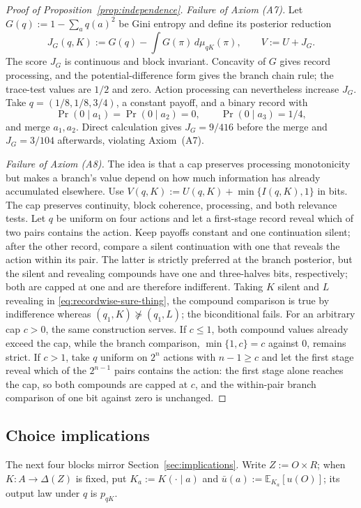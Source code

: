 \documentclass[11pt,a4paper]{article}
\theoremstyle{definition}
\newcommand{\D}{\Delta}
\newcommand{\E}{\mathbb E}
\newcommand{\1}{\mathbf 1}
\begin{document}
\begin{proof}[Proof of Proposition~\ref{prop:independence}]
\emph{Failure of Axiom \textup{(A7)}.}
Let $G(q):=1-\sum_aq(a)^2$ be Gini entropy and define its posterior reduction
\[
 J_G(q,K):=G(q)-\int G(\pi)\,d\mu_{qK}(\pi),
 \qquad V:=U+J_G.
\]
The score $J_G$ is continuous and block invariant.  Concavity of $G$ gives
record processing, and the potential-difference form gives the branch chain
rule; the trace-test values are $1/2$ and zero.
Action processing can nevertheless increase $J_G$.  Take
$q=(1/8,1/8,3/4)$, a constant payoff, and a binary record with
\[
 \Pr(0\mid a_1)=\Pr(0\mid a_2)=0,
 \qquad \Pr(0\mid a_3)=1/4,
\]
and merge $a_1,a_2$.  Direct calculation gives $J_G=9/416$ before the merge
and $J_G=3/104$ afterwards, violating Axiom~\textup{(A7)}.

\emph{Failure of Axiom \textup{(A8)}.}
The idea is that a cap preserves processing monotonicity but makes a branch's
value depend on how much information has already accumulated elsewhere.
Use $V(q,K):=U(q,K)+\min\{I(q,K),1\}$ in bits.  The cap preserves continuity, block
coherence, processing, and both relevance tests.  Let $q$ be uniform on four
actions and let a first-stage record reveal which of two pairs contains the
action.  Keep payoffs constant and one continuation silent; after the other
record, compare a silent continuation with one that reveals the action within its pair.  The
latter is strictly preferred at the branch posterior, but the silent and revealing compounds have
one and three-halves bits, respectively; both are capped at one and are therefore indifferent.
Taking $K$ silent and $L$ revealing in
\eqref{eq:recordwise-sure-thing}, the compound comparison is true by
indifference whereas $(q_1,K)\not\succeq(q_1,L)$; the biconditional fails.
For an arbitrary cap $c>0$, the same construction serves.  If $c\le1$, both
compound values already exceed the cap, while the branch comparison,
$\min\{1,c\}=c$ against $0$, remains strict.  If $c>1$, take $q$ uniform on
$2^n$ actions with $n-1\ge c$ and let the first stage reveal which of the
$2^{n-1}$ pairs contains the action: the first stage alone reaches the cap, so
both compounds are capped at $c$, and the within-pair branch comparison of one
bit against zero is unchanged.
\end{proof}

\subsection{Choice implications}\label{app:choice-proofs}

The next four blocks mirror Section~\ref{sec:implications}.  Write
$Z:=O\times R$; when $K:A\to\D(Z)$ is fixed, put
$K_a:=K(\cdot\mid a)$ and
$\bar u(a):=\E_{K_a}[u(O)]$; its output law under $q$ is $p_{qK}$.
\end{document}
